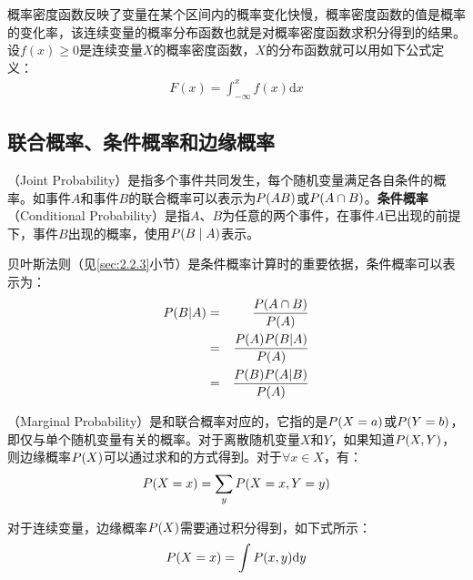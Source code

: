 \parinterval 概率密度函数反映了变量在某个区间内的概率变化快慢，概率密度函数的值是概率的变化率，该连续变量的概率分布函数也就是对概率密度函数求积分得到的结果。设$f(x) \geq 0$是连续变量$X$的概率密度函数，$X$的分布函数就可以用如下公式定义：
\begin{eqnarray}
F(x)=\int_{-\infty}^x f(x)\textrm{d}x
\label{eq:2-1}
\end{eqnarray}


\subsection{联合概率、条件概率和边缘概率}
（Joint Probability）是指多个事件共同发生，每个随机变量满足各自条件的概率。如事件$A$和事件$B$的联合概率可以表示为${P}(AB)$或${P}(A\cap{B})$。{\small\sffamily\bfseries{条件概率}}（Conditional Probability）是指$A$、$B$为任意的两个事件，在事件$A$已出现的前提下，事件$B$出现的概率，使用${P}(B \mid A)$表示。

\parinterval 贝叶斯法则（见\ref{sec:2.2.3}小节）是条件概率计算时的重要依据，条件概率可以表示为：
\begin{eqnarray}
{P}{(B|A)} & = & \frac{{P}(A\cap{B})}{{P}(A)}  \nonumber \\
                           & = & \frac{{P}(A){P}(B|A)}{{P}(A)}  \nonumber \\
                           & = & \frac{{P}(B){P}(A|B)}{{P}(A)}
\label{eq:2-2}
\end{eqnarray}

（Marginal Probability）是和联合概率对应的，它指的是${P}(X=a)$或${P}(Y=b)$，即仅与单个随机变量有关的概率。对于离散随机变量$X$和$Y$，如果知道${P}(X,Y)$，则边缘概率${P}(X)$可以通过求和的方式得到。对于$\forall x \in X $，有：
\begin{eqnarray}
{P}(X=x)=\sum_{y}  {P}(X=x,Y=y)
\label{eq:2-3}
\end{eqnarray}

\parinterval 对于连续变量，边缘概率${P}(X)$需要通过积分得到，如下式所示：
\begin{eqnarray}
{P}(X=x)=\int {P}(x,y)\textrm{d}y
\label{eq:2-4}
\end{eqnarray}

